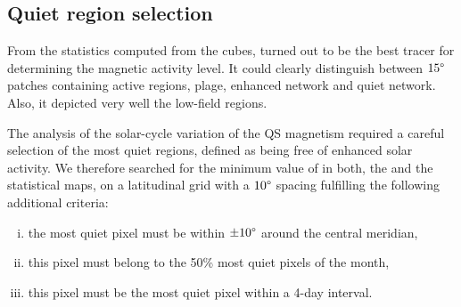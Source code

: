 \documentclass{aa}
\begin{document}
 

\subsection{Quiet region selection\label{quietregion}}

From the 
statistics computed from the cubes, 
\brms{}
turned out to be the best tracer for determining the magnetic activity level. It could clearly distinguish between $15\degree$ patches containing active regions, plage, enhanced network and quiet network. Also, it depicted very well the low-field \IN{} regions.

The analysis of the solar-cycle variation of the 
QS
magnetism required a careful selection of the most quiet regions, defined as being free of enhanced solar activity. We therefore searched for the minimum value of \brms{} in both, the \nw{} and the \inw{} statistical maps, on a latitudinal grid with a $10\degree$ spacing fulfilling the following additional criteria:
\begin{enumerate}[(i)]
	\item\label{c1} the most quiet pixel must be within $\pm10\degree$ around the central meridian,
	\item\label{c2}  this pixel must belong to the 50\% most quiet pixels of the month,
	\item\label{c3}  this pixel must be the most quiet pixel within a 4-day interval.
\end{enumerate}
\end{document}
